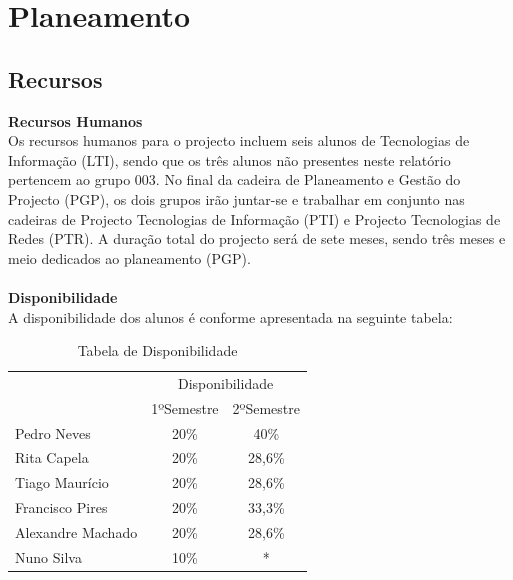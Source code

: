 \documentclass[12pt, a4paper, twoside]{report} %
\begin{document}

\chapter{Planeamento}

\section{Recursos}

\textbf{Recursos Humanos}
\\

Os recursos humanos para o projecto incluem seis alunos de Tecnologias de Informação (LTI), sendo que os três alunos não presentes neste relatório pertencem ao grupo 003. 
No final da cadeira de Planeamento e Gestão do Projecto (PGP), os dois grupos irão juntar-se e trabalhar em conjunto nas cadeiras de Projecto Tecnologias de Informação (PTI) e Projecto Tecnologias de Redes (PTR). A duração total do projecto será de sete meses, sendo três meses e meio dedicados ao planeamento (PGP).
\\
\\
\textbf{Disponibilidade}
\\

A disponibilidade dos alunos é conforme apresentada na seguinte tabela:

\begin{table}[h]
\centering
\begin{tabular}{|l|c c|}
\hline
\multirow{2}{*}{} & \multicolumn{2}{c|}{Disponibilidade} \\ \cline{2-3} 
                  		& 1ºSemestre        & 2ºSemestre       \\ \hline
Pedro Neves       		& 20\%              & 40\%             \\ \hline
Rita Capela       		& 20\%              & 28,6\%           \\ \hline
Tiago Maurício    		& 20\%              & 28,6\%           \\ \hline
Francisco Pires   		& 20\%              & 33,3\%           \\ \hline
Alexandre Machado 		& 20\%              & 28,6\%           \\ \hline
Nuno Silva\footnotemark	& 10\%              & *                \\ \hline
\end{tabular}
\caption{Tabela de Disponibilidade}
\label{disponibilidade}
\end{table}
\end{document}
